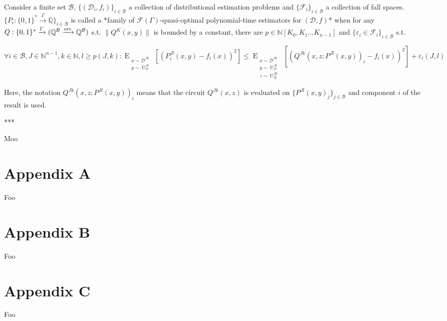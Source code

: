 \documentclass[a4paper]{article}
\newcommand{\Bool}{\{0,1\}}
\newcommand{\Words}{{\Bool^*}}
\newcommand{\EE}[2]{\operatorname{E}_{\substack{#1 \\ #2}}}
\newcommand{\EEE}[3]{\operatorname{E}_{\substack{#1 \\ #2 \\ #3}}}
\DeclareMathOperator{\Un}{U}
\newcommand{\Nats}{\mathbb{N}}
\newcommand{\Rats}{\mathbb{Q}}
\newcommand{\NatPoly}{\Nats[K_0, K_1 \ldots K_{n-1}]}
\newcommand{\Norm}[1]{\lVert #1 \rVert}
\newcommand{\Dist}{\mathcal{D}}
\newcommand{\Fall}{\mathcal{F}}
\newcommand{\EG}{\Fall(\Gamma)}
\newcommand{\Scheme}{\xrightarrow{\Gamma}}
\newcommand{\ORC}{\xrightarrow{\textnormal{orc}}}
\newcommand{\Base}{\mathcal{B}}
\begin{document}
Consider a finite set ${\Base}$, ${\{(\Dist_i,f_i)\}_{i \in \Base}}$ a collection of distributional estimation problems and ${\{\Fall_i\}_{i \in \Base}}$ a collection of fall spaces. ${\{P_i: \Words \Scheme \Rats\}_{i \in \Base}}$ is called a *family of ${\EG}$-quasi-optimal polynomial-time estimators for ${(\Dist,f)}$* when for any ${Q: \Words \Scheme (\Rats^{\Base} \ORC \Rats^{\Base})}$ s.t. ${\Norm{Q^K(x,y)}}$ is bounded by a constant, there are ${p \in \NatPoly}$ and ${\{\varepsilon_i \in \Fall_i\}_{i \in \Base}}$ s.t.

$$\forall i \in \Base, J \in \Nats^{n-1}, k \in \Nats, l \geq p(J,k): \EE{x \sim \Dist^{Jk}}{y \sim \Un_P^{Jl}}[(P_i^{Jl}(x,y)-f_i(x))^2] \leq \EEE{x \sim \Dist^{Jk}}{y \sim \Un_P^{Jl}}{z \sim \Un_Q^{Jk}}[(Q^{Jk}(x,z;P^{Jl}(x,y))_i-f_i(x))^2]+\varepsilon_i(J,l)$$

Here, the notation ${Q^{Jk}(x,z;P^{Jl}(x,y))_i}$ means that the circuit ${Q^{Jk}(x,z)}$ is evaluated on ${\{P^{Jl}(x,y)_j\}_{j \in \Base}}$ and component ${i}$ of the result is used.

***

Moo

\section{Appendix A}

Foo

\section{Appendix B}

Foo

\section{Appendix C}

Foo
\end{document}
